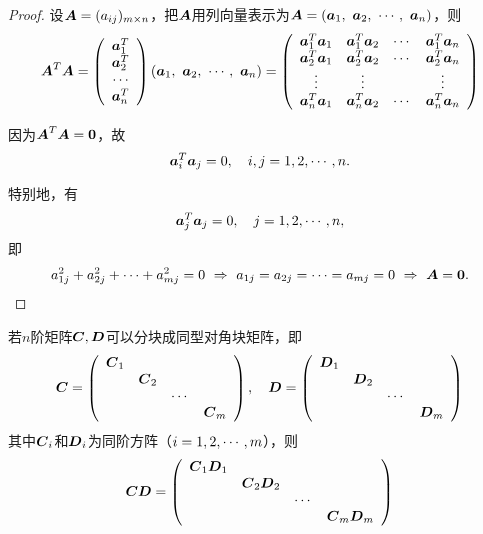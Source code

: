 \begin{proof}
设$\MA=(a_{ij})_{m\times n}$，把$\MA$用列向量表示为$\MA=(\va_1, ~\va_2,~\cd,~\va_n)$，则
$$
\MA^T\MA = \left(
  \begin{array}{c}
    \va_1^T\\
    \va_2^T\\
    \cd \\
    \va_n^T
  \end{array}
\right) (\va_1, ~\va_2,~\cd,~\va_n) = \left(
  \begin{array}{cccc}
    \va_1^T\va_1 & \va_1^T\va_2 & \cd & \va_1^T\va_n\\
    \va_2^T\va_1 & \va_2^T\va_2 & \cd & \va_2^T\va_n\\
    \vd & \vd & & \vd \\
    \va_n^T\va_1 & \va_n^T\va_2 & \cd & \va_n^T\va_n
  \end{array}
\right)
$$

因为$\MA^T\MA=\M0$，故
$$
\va_i^T \va_j = 0, \quad i,j=1,2,\cd,n.
$$

特别地，有
$$
\va_j^T \va_j = 0, \quad j=1,2,\cd,n,
$$
即
$$
a_{1j}^2+a_{2j}^2+\cd+a_{mj}^2=0  ~\Rightarrow~ a_{1j}=a_{2j}=\cd=a_{mj}=0 ~\Rightarrow~ \MA = \M0.
$$
\end{proof}




\begin{li}
  若$n$阶矩阵$\MC,\MD$可以分块成同型对角块矩阵，即
  $$
  \MC = \left(
    \begin{array}{cccc}
      \MC_1&&&\\
      &\MC_2&&\\
      &&\cd&\\
      &&&\MC_m
    \end{array}
  \right),\quad
  \MD = \left(
    \begin{array}{cccc}
      \MD_1&&&\\
      &\MD_2&&\\
      &&\cd&\\
      &&&\MD_m
    \end{array}
  \right)
  $$
  其中$\MC_i$和$\MD_i$为同阶方阵（$i=1,2,\cd,m$），则
  $$
  \MC\MD = \left(
    \begin{array}{cccc}
      \MC_1\MD_1&&&\\
      &\MC_2\MD_2&&\\
      &&\cd&\\
      &&&\MC_m\MD_m
    \end{array}
  \right)
  $$
\end{li}









